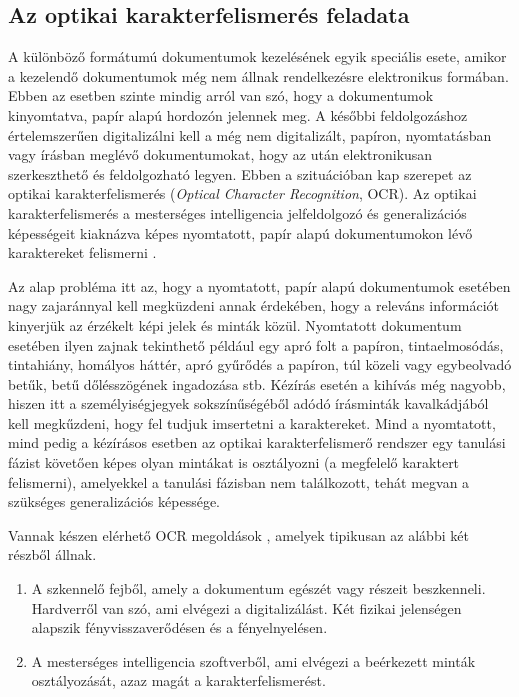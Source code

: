 \subsection{Az optikai karakterfelismerés feladata}

A különböző formátumú dokumentumok kezelésének egyik speciális esete, amikor a kezelendő dokumentumok még nem állnak rendelkezésre elektronikus formában. Ebben az esetben szinte mindig arról van szó, hogy a dokumentumok kinyomtatva, papír alapú hordozón jelennek meg. A későbbi feldolgozáshoz értelemszerűen digitalizálni kell a még nem digitalizált, papíron, nyomtatásban vagy írásban meglévő dokumentumokat, hogy az után elektronikusan szerkeszthető és feldolgozható legyen. Ebben a szituációban kap szerepet az optikai karakterfelismerés (\textit{Optical Character Recognition}, OCR). Az optikai karakterfelismerés a mesterséges intelligencia jelfeldolgozó és generalizációs képességeit kiaknázva képes nyomtatott, papír alapú dokumentumokon lévő karaktereket felismerni \cite{liu2013online}.

Az alap probléma itt az, hogy a nyomtatott, papír alapú dokumentumok esetében nagy zajaránnyal kell megküzdeni annak érdekében, hogy a releváns információt kinyerjük az érzékelt képi jelek és minták közül. Nyomtatott dokumentum esetében ilyen zajnak tekinthető például egy apró folt a papíron, tintaelmosódás, tintahiány, homályos háttér, apró gyűrődés a papíron, túl közeli vagy egybeolvadó betűk, betű dőlésszögének ingadozása stb. Kézírás esetén a kihívás még nagyobb, hiszen itt a személyiségjegyek sokszínűségéből adódó írásminták kavalkádjából kell megkűzdeni, hogy fel tudjuk imsertetni a karaktereket. Mind a nyomtatott, mind pedig a kézírásos esetben az optikai karakterfelismerő rendszer egy tanulási fázist követően képes olyan mintákat is osztályozni (a megfelelő karaktert felismerni), amelyekkel a tanulási fázisban nem találkozott, tehát megvan a szükséges generalizációs képessége.

Vannak készen elérhető OCR megoldások \cite{tmwebdvi77}, amelyek tipikusan az alábbi két részből állnak.
\begin{enumerate}
\item A szkennelő fejből, amely a dokumentum egészét vagy részeit beszkenneli. Hardverről van szó, ami elvégezi a digitalizálást. Két fizikai jelenségen alapszik fényvisszaverődésen és a fényelnyelésen.
\item  A mesterséges intelligencia szoftverből, ami elvégezi a beérkezett minták osztályozását, azaz magát a karakterfelismerést.
\end{enumerate}

